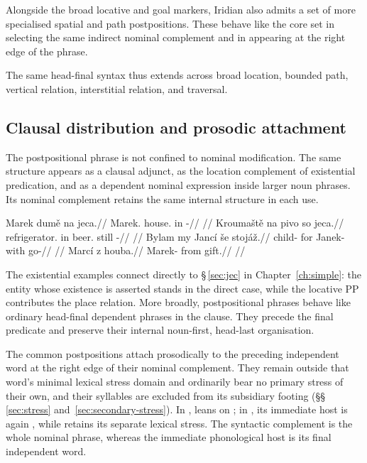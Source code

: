 Alongside the broad locative and goal markers, Iridian also admits a set of more
specialised spatial and path postpositions. These behave like the core set in
selecting the same indirect nominal complement and in appearing at the right
edge of the phrase.

\pex
\a {} 
\a {} 
\a {} 
\a {} 
\a {} 
\xe

The same head-final syntax thus extends across broad location, bounded path,
vertical relation, interstitial relation, and traversal.

\subsection{Clausal distribution and prosodic attachment}
\label{sec:nm-postp-clausal}
\label{sec:nm-postp-status}

The postpositional phrase is not confined to nominal modification. The same
structure appears as a clausal adjunct, as the location complement of
existential predication, and as a dependent nominal expression inside larger
noun phrases. Its nominal complement retains the same internal structure in each use.

\pex
\a
\begingl
\gla Marek dumě na jeca.//
\glb Marek.\Dir{} house.\Ind{} in \Exst{}-\Cont{}//
\glft {}//
\endgl
\a
\begingl
\gla Kroumaště na pivo so jeca.//
\glb refrigerator.\Ind{} in beer.\Dir{} still \Exst{}-\Cont{}//
\glft {}//
\endgl
\a
\begingl
\gla Bylam my Jancí še stojáž.//
\glb child-\Ind{} for Janek-\Ind{} with go-\Ctpl{}//
\glft {}//
\endgl
\a
\begingl
\gla Marcí z houba.//
\glb Marek-\Ind{} from gift.\Dir{}//
\glft {}//
\endgl
\xe

\noindent The existential examples connect directly to §\,\ref{sec:jec} in
Chapter~\ref{ch:simple}: the entity whose existence is asserted stands in the
direct case, while the locative PP contributes the place relation. More broadly,
postpositional phrases behave like ordinary head-final dependent phrases in the
clause. They precede the final predicate and preserve their internal noun-first,
head-last organisation.

The common postpositions attach prosodically to the preceding independent word
at the right edge of their nominal complement. They remain outside that word's
minimal lexical stress domain and ordinarily bear no primary stress of their
own, and their syllables are excluded from its subsidiary footing
(§§\,\ref{sec:stress} and~\ref{sec:secondary-stress}). In ,
 leans on ; in , its immediate host is again
, while  retains its separate lexical stress. The
syntactic complement is the whole nominal phrase, whereas the immediate
phonological host is its final independent word.

